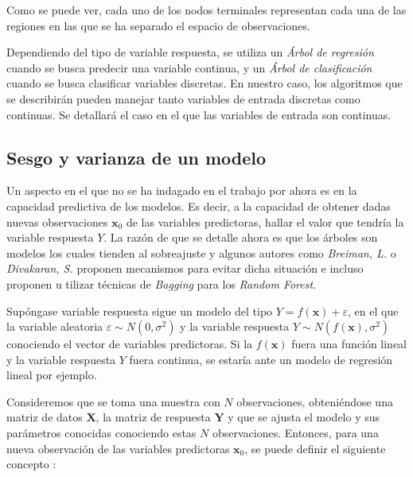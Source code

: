 \noindent Como se puede ver, cada uno de los nodos terminales representan cada una de las regiones en las que se ha separado el espacio de observaciones. 

\noindent Dependiendo del tipo de variable respuesta, se utiliza un \emph{Árbol de regresión} cuando se busca predecir una variable continua, y un \emph{Árbol de clasificación} cuando se busca clasificar variables discretas. En nuestro caso, los algoritmos que se describirán pueden manejar tanto variables de entrada discretas como continuas. Se detallará el caso en el que las variables de entrada son continuas.

\subsection*{Sesgo y varianza de un modelo}

\noindent Un aspecto en el que no se ha indagado en el trabajo por ahora es en la capacidad predictiva de los modelos. Es decir, a la capacidad de obtener dadas nuevas observaciones $\mathbf{x}_0$ de las variables predictoras, hallar el valor que tendría la variable respuesta $Y$. La razón de que se detalle ahora es que los árboles son modelos los cuales tienden al sobreajuste y algunos autores como \emph{Breiman, L.}\cite{Breiman 1984} o \emph{Divakaran, S.}\cite{Divakaran 2022} proponen mecanismos para evitar dicha situación e incluso proponen u tilizar técnicas de \emph{Bagging} para los \emph{Random Forest}\cite{Breiman 2001}.

\noindent Supóngase variable respuesta sigue un modelo del tipo $Y=f(\mathbf{x})+\varepsilon$, en el que la variable aleatoria $\varepsilon\sim N(0,\sigma^2)$ y la variable respuesta $Y\sim N(f(\mathbf{x}),\sigma^2)$ conociendo el vector de variables predictoras. Si la $f(\mathbf{x})$ fuera una función lineal y la variable respuesta $Y$ fuera continua, se estaría ante un modelo de regresión lineal por ejemplo. 

\noindent Consideremos que se toma una muestra con  $N$ observaciones, obteniéndose una matriz de datos $\mathbf{X}$, la matriz de respuesta $\mathbf{Y}$ y que se ajusta el modelo y sus parámetros conocidas conociendo estas $N$ observaciones. Entonces, para una nueva observación de las variables predictoras $\mathbf{x}_0$, se puede definir el siguiente concepto \cite{Hastie 2001, Lawless 2010}:

